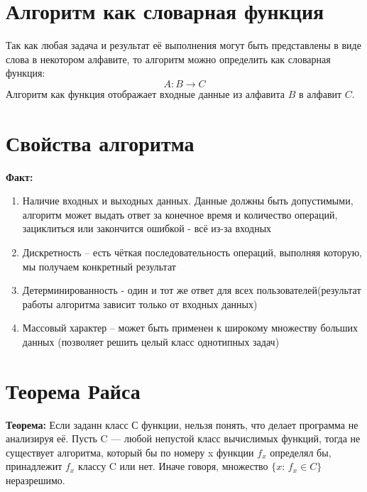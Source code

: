 \documentclass[../main.tex]{subfiles}
\begin{document}
%
\section{Алгоритм как словарная функция}
Так как любая задача и результат её выполнения могут быть представлены в виде слова в некотором алфавите, то алгоритм можно определить как словарная функция:
\[ A:B \to C\]
Алгоритм как функция отображает входные данные из алфавита $B$ в алфавит $C$.

%
\section{Свойства алгоритма}
\textbf{Факт:
} \begin{enumerate}
	\item Наличие входных и выходных данных. Данные должны быть допустимыми, алгоритм может выдать ответ за конечное время и количество операций, зациклиться или закончится ошибкой - всё из-за входных
	\item Дискретность – есть чёткая последовательность операций, выполняя которую, мы получаем конкретный результат
	\item Детерминированность - один и тот же ответ для всех пользователей(результат работы алгоритма зависит только от входных данных)
	\item Массовый характер – может быть применен к широкому множеству больших данных (позволяет решить целый класс однотипных задач)
\end{enumerate}

%
\section{Теорема Райса}
\textbf{Теорема:
} Если заданн класс С функции, нельзя понять, что делает программа не анализируя её.  Пусть C — любой непустой класс вычислимых функций, тогда не существует алгоритма, который бы по номеру x функции $f_x$ определял бы, принадлежит $f_x$ классу C или нет. Иначе говоря, множество $\{x\colon\, f_x\in C\}$ неразрешимо.

%
\end{document}
